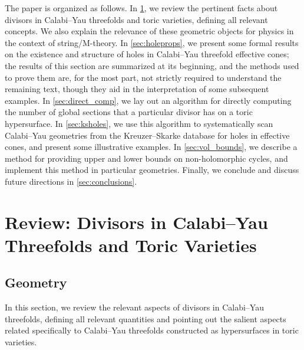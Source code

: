 \documentclass[11pt,dvipsnames]{article}
\theoremstyle{definition}
\begin{document}
The paper is organized as follows. In \cref{sec:review}, we review the pertinent facts about divisors in Calabi--Yau threefolds and toric varieties, defining all relevant concepts. We also explain the relevance of these geometric objects for physics in the context of string/M-theory. In \cref{sec:holeprops}, we present some formal results on the existence and structure of holes in Calabi--Yau threefold effective cones; the results of this section are summarized at its beginning, and the methods used to prove them are, for the most part, not strictly required to understand the remaining text, though they aid in the interpretation of some subsequent examples. 
In \cref{sec:direct_comp}, we lay out an algorithm for directly computing the number of global sections that a particular divisor has on a toric hypersurface. In \cref{sec:ksholes}, we use this algorithm to systematically scan Calabi--Yau geometries from the Kreuzer--Skarke database for holes in effective cones, and present some illustrative examples. In \cref{sec:vol_bounds}, we describe a method for providing upper and lower bounds on non-holomorphic cycles, and implement this method in particular geometries. Finally, we conclude and discuss future directions in \cref{sec:conclusions}.

\section{Review: Divisors in Calabi--Yau Threefolds and Toric Varieties} \label{sec:review}

\subsection{Geometry}\label{sec:review-geometry}

In this section, we review the relevant aspects of divisors in Calabi--Yau threefolds, defining all relevant quantities and pointing out the salient aspects related specifically to Calabi--Yau threefolds constructed as hypersurfaces in toric varieties.
\end{document}

